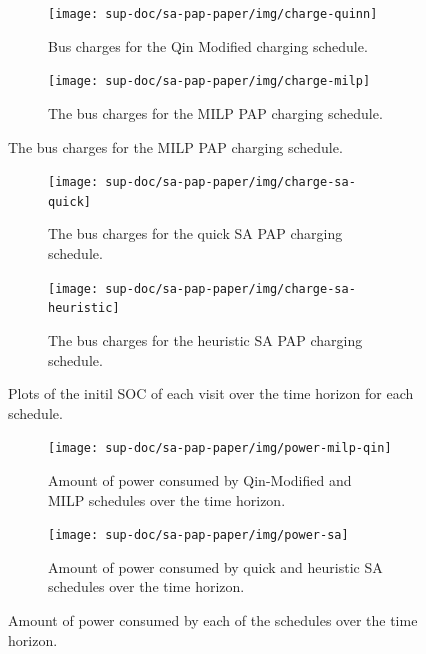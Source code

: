 \documentclass[ee,thesis]{usuthesis}
\begin{document}
\begin{figure}
  \begin{subfigure}[t]{\textwidth}
    \centering
    \texttt{[image: sup-doc/sa-pap-paper/img/charge-quinn]}
    \caption{Bus charges for the Qin Modified charging schedule.}
    \label{subfig:qin-charge}
  \end{subfigure}
  \hfill
  \begin{subfigure}[t]{\textwidth}
    \centering
    \texttt{[image: sup-doc/sa-pap-paper/img/charge-milp]}
    \caption{The bus charges for the MILP PAP charging schedule.}
    \label{subfig:milp-charge}
  \end{subfigure}
  \hfill
\end{figure}

\begin{figure}\ContinuedFloat
  \begin{subfigure}[t]{\textwidth}
    \centering
    \texttt{[image: sup-doc/sa-pap-paper/img/charge-sa-quick]}
    \caption{The bus charges for the quick SA PAP charging schedule.}
    \label{subfig:sa-quick-charge}
  \end{subfigure}
  \hfill
  \begin{subfigure}[t]{\textwidth}
    \centering
    \texttt{[image: sup-doc/sa-pap-paper/img/charge-sa-heuristic]}
    \caption{The bus charges for the heuristic SA PAP charging schedule.}
    \label{subfig:sa-heuristic-charge}
  \end{subfigure}
  \caption{Plots of the initil SOC of each visit over the time horizon for each schedule.}
  \label{fig:charge}
\end{figure}

\begin{figure}
  \begin{subfigure}[t]{\textwidth}
    \centering
    \texttt{[image: sup-doc/sa-pap-paper/img/power-milp-qin]}
    \caption{Amount of power consumed by Qin-Modified and MILP schedules over the time horizon.}
    \label{fig:power-usage-milp-qin}
  \end{subfigure}

  \hfill

  \begin{subfigure}[t]{\textwidth}
    \centering
    \texttt{[image: sup-doc/sa-pap-paper/img/power-sa]}
    \caption{Amount of power consumed by quick and heuristic SA schedules over the time horizon.}
    \label{fig:power-usage-sa}
  \end{subfigure}
  \caption{Amount of power consumed by each of the schedules over the time horizon.}
  \label{fig:power}
\end{figure}
\end{document}
